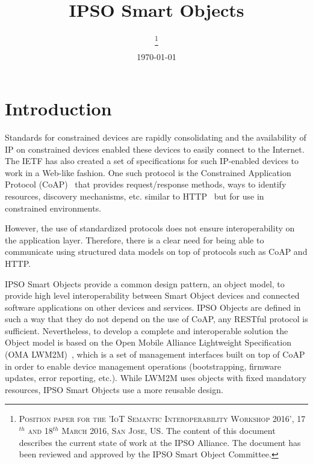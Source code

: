 \documentclass[peerreview, a4paper, 7pt]{IEEEtran}
\begin{document}
\title{IPSO Smart Objects}

\author{
\thanks{\textsc{Position paper for the 'IoT Semantic Interoperability Workshop 2016', 17$^{th}$ and 18$^{th}$ March 2016, San Jose, US.} The content of this document describes the current state of work at the IPSO Alliance. The document has been reviewed and approved by the IPSO Smart Object Committee.}
}

\date{\today}

\maketitle


\section{Introduction}

Standards for constrained devices are rapidly consolidating and the availability of IP on constrained devices enabled these devices to easily connect to the Internet. The IETF has also created a set of specifications for such IP-enabled devices to work in a Web-like fashion. One such protocol is the Constrained Application Protocol (CoAP)~\cite{rfc7252} that provides request/response methods, ways to identify resources, discovery mechanisms, etc. similar to HTTP~\cite{rfc2616} but for use in constrained environments.

However, the use of standardized protocols does not ensure interoperability on the application layer.  Therefore, there is a clear need for being able to communicate using structured data models on top of protocols such as CoAP and HTTP.

IPSO Smart Objects provide a common design pattern, an object model, to provide high level interoperability between Smart Object devices and connected software applications on other devices and services. IPSO Objects are defined in such a way that they do not depend on the use of CoAP, any RESTful protocol is sufficient. Nevertheless, to develop a complete and interoperable solution the Object model is based on the Open Mobile Alliance Lightweight Specification (OMA LWM2M)~\cite{lwm2m}, which is a set of management interfaces built on top of CoAP in order to enable device management operations (bootstrapping, firmware updates, error reporting, etc.). While LWM2M uses objects with fixed mandatory resources, IPSO Smart Objects use a more reusable design. 
\end{document}
